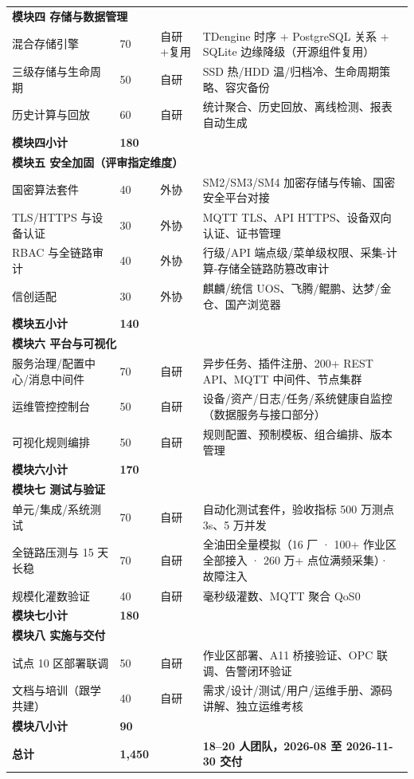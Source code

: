 \documentclass[11pt,a4paper]{ctexart}
\begin{document}
\begin{longtable}{p{4.6cm} p{1.8cm} p{1.5cm} p{4.2cm}}
\multicolumn{4}{l}{\textbf{模块四 存储与数据管理}} \\
混合存储引擎 & 70 & 自研+复用 & TDengine 时序 + PostgreSQL 关系 + SQLite 边缘降级（开源组件复用） \\
三级存储与生命周期 & 50 & 自研 & SSD 热/HDD 温/归档冷、生命周期策略、容灾备份 \\
历史计算与回放 & 60 & 自研 & 统计聚合、历史回放、离线检测、报表自动生成 \\
\textbf{模块四小计} & \textbf{180} & & \\
\midrule

\multicolumn{4}{l}{\textbf{模块五 安全加固（评审指定维度）}} \\
国密算法套件 & 40 & 外协 & SM2/SM3/SM4 加密存储与传输、国密安全平台对接 \\
TLS/HTTPS 与设备认证 & 30 & 外协 & MQTT TLS、API HTTPS、设备双向认证、证书管理 \\
RBAC 与全链路审计 & 40 & 外协 & 行级/API 端点级/菜单级权限、采集-计算-存储全链路防篡改审计 \\
信创适配 & 30 & 外协 & 麒麟/统信 UOS、飞腾/鲲鹏、达梦/金仓、国产浏览器 \\
\textbf{模块五小计} & \textbf{140} & & \\
\midrule

\multicolumn{4}{l}{\textbf{模块六 平台与可视化}} \\
服务治理/配置中心/消息中间件 & 70 & 自研 & 异步任务、插件注册、200+ REST API、MQTT 中间件、节点集群 \\
运维管控控制台 & 50 & 自研 & 设备/资产/日志/任务/系统健康自监控（数据服务与接口部分） \\
可视化规则编排 & 50 & 自研 & 规则配置、预制模板、组合编排、版本管理 \\
\textbf{模块六小计} & \textbf{170} & & \\
\midrule

\multicolumn{4}{l}{\textbf{模块七 测试与验证}} \\
单元/集成/系统测试 & 70 & 自研 & 自动化测试套件，验收指标 500 万测点 3s、5 万并发 \\
全链路压测与 15 天长稳 & 70 & 自研 & 全油田全量模拟（16 厂 · 100+ 作业区全部接入 · 260 万+ 点位满频采集）· 故障注入 \\
规模化灌数验证 & 40 & 自研 & 毫秒级灌数、MQTT 聚合 QoS0 \\
\textbf{模块七小计} & \textbf{180} & & \\
\midrule

\multicolumn{4}{l}{\textbf{模块八 实施与交付}} \\
试点 10 区部署联调 & 50 & 自研 & 作业区部署、A11 桥接验证、OPC 联调、告警闭环验证 \\
文档与培训（跟学共建） & 40 & 自研 & 需求/设计/测试/用户/运维手册、源码讲解、独立运维考核 \\
\textbf{模块八小计} & \textbf{90} & & \\
\midrule
\textbf{总计} & \textbf{1,450} & & \textbf{18--20 人团队，2026-08 至 2026-11-30 交付} \\
\bottomrule
\end{longtable}
\end{document}

